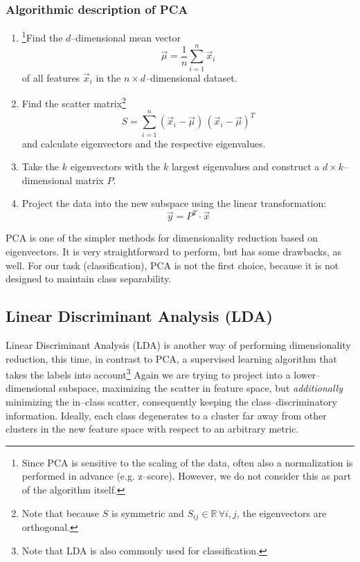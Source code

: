 \subsubsection{Algorithmic description of PCA}
\label{par:pca-algorithm}
\begin{enumerate}
\item \footnote{Since PCA is sensitive to the scaling of the data, often also a normalization is performed in advance (e.g. z--score). However, we do not consider this as part of the algorithm itself.}Find the $d$--dimensional mean vector
\begin{equation}
\label{eq:mean-vector}
\vec \mu = \frac{1}{n} \sum_{i = 1}^n \vec x_i
\end{equation}
of all features $\vec x_i$ in the $n \times d$--dimensional dataset.
\item Find the scatter matrix\footnote{Note that because $S$ is symmetric and $S_{ij} \in \mathbb{R} \, \forall i,j$, the eigenvectors are orthogonal.}
\begin{equation}
S = \sum_{i=1}^n (\vec x_i - \vec \mu) \, (\vec x_i - \vec \mu)^T
\end{equation}
and calculate eigenvectors and the respective eigenvalues.
\item Take the $k$ eigenvectors with the $k$ largest eigenvalues and construct a $d \times k$--dimensional matrix $P$.
\item Project the data into the new subspace using the linear transformation:
\begin{equation}
\vec y = P^T \cdot \vec x
\end{equation}
\end{enumerate}

PCA is one of the simpler methods for dimensionality reduction based on eigenvectors. It is very straightforward to perform, but has some drawbacks, as well. For our task (classification), PCA is not the first choice, because it is not designed to maintain class separability.

\subsection{Linear Discriminant Analysis (LDA)}
\label{sec:theory:lda}

Linear Discriminant Analysis (LDA) is another way of performing dimensionality reduction, this time, in contrast to PCA, a supervised learning algorithm that takes the labels into account\footnote{Note that LDA is also commonly used for classification.} Again we are trying to project into a lower--dimensional subspace, maximizing the scatter in feature space, but \emph{additionally} minimizing the in--class scatter, consequently keeping the class--discriminatory information. Ideally, each class degenerates to a cluster far away from other clusters in the new feature space with respect to an arbitrary metric.

